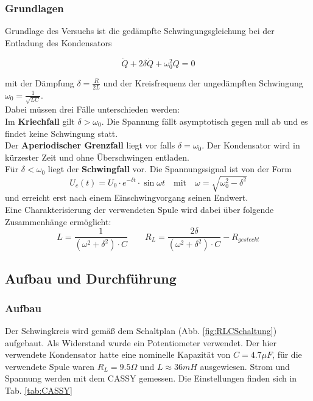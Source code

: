 \documentclass[12pt,a4paper]{article}
\begin{document}
\subsubsection{Grundlagen}
Grundlage des Versuchs ist die gedämpfte Schwingungsgleichung bei der Entladung des Kondensators

\begin{equation}
\ddot{Q}+2\delta \dot{Q}+\omega_0^2 Q=0
\end{equation}

mit der Dämpfung $\delta=\frac{R}{2L}$ und der Kreisfrequenz der ungedämpften Schwingung $\omega_0=\frac{1}{\sqrt{LC}}$.\\
Dabei müssen drei Fälle unterschieden werden:\\
Im \textbf{Kriechfall} gilt $\delta > \omega_0$. Die Spannung fällt asymptotisch gegen null ab und es findet keine Schwingung statt.\\
Der \textbf{Aperiodischer Grenzfall} liegt vor falls $\delta=\omega_0$. Der Kondensator wird in kürzester Zeit und ohne Überschwingen entladen.\\
Für $\delta<\omega_0$ liegt der \textbf{Schwingfall} vor. Die Spannungssignal ist von der Form 
\begin{equation}
U_c(t)=U_0 \cdot e^{-\delta t} \cdot \sin{\omega t} \quad \text{mit} \quad \omega=\sqrt{\omega_0^2-\delta^2}
\end{equation}
und erreicht erst nach einem Einschwingvorgang seinen Endwert.\\

Eine Charakterisierung der verwendeten Spule wird dabei über folgende Zusammenhänge ermöglicht:
\begin{equation}
L=\frac{1}{(\omega^2+\delta^2)\cdot C} \qquad  R_L=\frac{2\delta}{(\omega^2+\delta^2)\cdot C}-R_{gesteckt}
\end{equation}

\subsection{Aufbau und Durchführung}
\subsubsection{Aufbau}

Der Schwingkreis wird gemäß dem Schaltplan (Abb. \ref{fig:RLCSchaltung}) aufgebaut. Als Widerstand wurde ein Potentiometer verwendet. Der hier verwendete Kondensator hatte eine nominelle Kapazität von $C=4.7 \mu F$, für die verwendete Spule waren $R_L=9.5 \Omega$ und $L \approx 36mH$ ausgewiesen. Strom und Spannung werden mit dem CASSY gemessen. Die Einstellungen finden sich in Tab. \ref{tab:CASSY}
\end{document}
